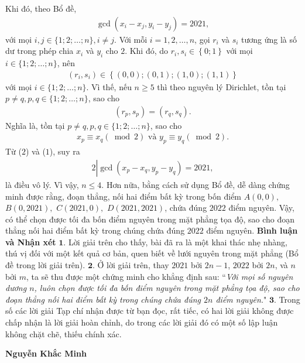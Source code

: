 \begin{multicols}{2}
	\vskip 0.05cm
	Khi đó, theo Bổ đề,
	\begin{align*}
		\gcd \left( {{x_i} - {x_j},{y_i} - {y_j}} \right) = 2021, \tag{$1$}
	\end{align*}
	với mọi $i, j \in \{1; 2; \ldots ; n\}, i \ne j$.
	\vskip 0.05cm
	Với mỗi $i = 1, 2, \ldots , n$, gọi $r_i$  và $s_i$  tương ứng là số dư trong phép chia $x_i$  và $y_i$  cho $2$.
	\vskip 0.05cm
	Khi đó, do  ${r_i},{s_i} \in \left\{ {0;1} \right\}$ với mọi $i \in \{1; 2; \ldots ; n\}$, nên
	\begin{align*}
		\left( {{r_i},{s_i}} \right) \in \left\{ {\left( {0,0} \right);\left( {0,1} \right);\left( {1,0} \right);\left( {1,1} \right)} \right\}
	\end{align*}
	với mọi $i \in \{1; 2; \ldots ; n\}$.
	\vskip 0.05cm
	Vì thế, nếu $n \ge  5$ thì theo nguyên lý Dirichlet, tồn tại $p \ne q, p, q \in \{1; 2; \ldots ; n\}$, sao cho
	\begin{align*}
		\left( {{r_p},{s_p}} \right) = \left( {{r_q},{s_q}} \right).
	\end{align*}
	Nghĩa là, tồn tại $p \ne q, p, q \in \{1; 2; \ldots ; n\}$, sao cho 
	\begin{align*}
		{x_p} \equiv {x_q}\left( {\bmod 2} \right) \text{ và } {y_p} \equiv {y_q}\left( {\bmod 2} \right). \tag{$2$}
	\end{align*}
	Từ ($2$) và ($1$), suy ra
	\begin{align*}
		2\left| {\gcd \left( {{x_p} - {x_q},{y_p} - {y_q}} \right) = 2021,} \right.
	\end{align*}
	là điều vô lý. Vì vậy, $n \le 4$.
	\vskip 0.05cm
	Hơn nữa, bằng cách sử dụng Bổ đề, dễ dàng chứng minh được rằng, đoạn thẳng, nối hai điểm bất kỳ trong bốn điểm $A(0, 0),$ $B(0, 2021),$ $C(2021, 0),$ $D(2021, 2021)$, chứa đúng $2022$ điểm nguyên.
	\vskip 0.05cm
	Vậy, có thể chọn được tối đa bốn điểm nguyên trong mặt phẳng tọa độ, sao cho đoạn thẳng nối hai điểm bất kỳ trong chúng chứa đúng $2022$ điểm nguyên.
	\vskip 0.05cm
	\textbf{\color{thachthuctoanhoc}Bình luận và Nhận xét}
	\vskip 0.05cm
	$\pmb{1.}$ Lời giải trên cho thấy, bài đã ra là một khai thác nhẹ nhàng, thú vị đối với một kết quả cơ bản, quen biết về lưới nguyên trong mặt phẳng (Bổ đề trong lời giải trên).
	\vskip 0.05cm
	$\pmb{2.}$ Ở lời giải trên, thay $2021$ bởi $2n - 1$, $2022$ bởi $2n$, và $n$ bởi $m$, ta sẽ thu được một chứng minh cho khẳng định sau:
	\vskip 0.05cm
	``\textit{Với mọi số nguyên dương $n$, luôn chọn được tối đa bốn điểm nguyên trong mặt phẳng tọa độ, sao cho đoạn thẳng nối hai điểm bất kỳ trong chúng chứa đúng $2n$ điểm nguyên.}"
	\vskip 0.05cm
	$\pmb{3.}$ Trong số các lời giải Tạp chí nhận được từ bạn đọc, rất tiếc, có hai lời giải không được chấp nhận là lời giải hoàn chỉnh, do trong các lời giải đó có một số lập luận không chặt chẽ, thiếu chính xác.
	\begin{flushright}
		\textbf{\color{thachthuctoanhoc}Nguyễn Khắc Minh}
	\end{flushright}
\end{multicols}
